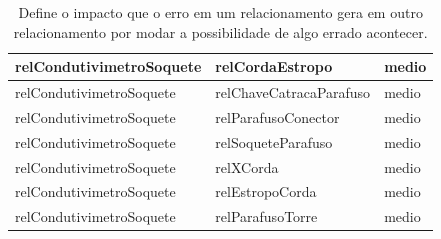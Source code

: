 \documentclass[12pt]{article}
\begin{document}
\begin{table}[H]
\begin{tabular}{|l|l|l|}
relCondutivimetroSoquete & relCordaEstropo & medio \\ \hline
relCondutivimetroSoquete & relChaveCatracaParafuso & medio \\ \hline
relCondutivimetroSoquete & relParafusoConector & medio \\ \hline
relCondutivimetroSoquete & relSoqueteParafuso & medio \\ \hline
relCondutivimetroSoquete & relXCorda & medio \\ \hline
relCondutivimetroSoquete & relEstropoCorda & medio \\ \hline
relCondutivimetroSoquete & relParafusoTorre & medio \\ \hline
\end{tabular}
\caption{Define o impacto que o erro em um relacionamento gera em outro relacionamento por modar a possibilidade de algo errado acontecer.}
\label{relation2}
\end{table}
\end{document}

